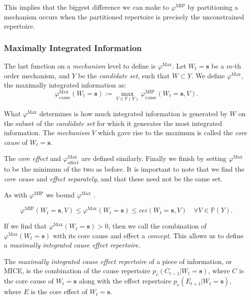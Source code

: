 This implies that the biggest difference we can make to $\varphi^{\text{MIP}}$ by partitioning a mechanism occurs when the partitioned repertoire is precisely the unconstrained repertoire. 



\subsubsection{Maximally Integrated Information}
The last function on a \textit{mechanism} level to define is $\varphi^{\text{Max}}$. Let $W_t = \mathbf{s}$ be a $m$-th order mechanism, and $Y$ be the \textit{candidate set}, such that $W \subset Y$. We define $\varphi^{\text{Max}}$, the maximally integrated information \cite{oizumi2014phenomenology} as: 
\begin{equation}
\label{def:core_cause}
\varphi^{\text{Max}}_{\text{cause}}(W_t = \mathbf{s}):=\max \limits_{V \in \mathbb{P}(Y)}\varphi^{\text{MIP}}_{\text{cause}}(W_t = \mathbf{s}, V).
\end{equation}

What $\varphi^{\text{Max}}$ determines is how much integrated information is generated by $W$ on the subset of the \textit{candidate set} for which it generates the most integrated information. The \textit{mechanism} $V$ which gave rise to the maximum is called the \textit{core cause} of $W_t = \mathbf{s}$.

The \textit{core effect} and  $\varphi^{\text{Max}}_{\text{effect}}$ are defined similarly. Finally we finish  by setting $\varphi^{\text{Max}}$ to be the minimum of the two as before. It is important to note that we find the \textit{core cause} and \textit{effect separately}, and that these need not be the same set.

As with $\varphi^{\text{MIP}}$ we bound $\varphi^{\text{Max}}$ \cite{marshall2016integrated}. 

\begin{equation}
\label{eq:bound_phimax}
\varphi^{\text{MIP}}(W_t = \mathbf{s}, V) \leq \varphi^{\text{Max}}(W_t = \mathbf{s})\leq cei(W_t = \mathbf{s}, V) \quad \forall V \in \mathbb{P}(Y).
\end{equation}

If we find that $\varphi^{\text{Max}}(W_t =\mathbf{s})>0$, then we call the combination of $\varphi^{\text{Max}}(W_t = \mathbf{s})$ with its core cause and effect a \textit{concept}. This allows us to define a \textit{maximally integrated cause effect repertoire}.

\begin{definition}
	{The \textit{maximally integrated cause effect repertoire} of a piece of information, or MICE, is the combination of the cause repertoire $p_c(C_{t-1}|W_t = \mathbf{s})$, where $C$ is the core cause of $W_t=\mathbf{s}$ along with the effect repertoire $p_e(E_{t+1}|W_t = \mathbf{s})$, where $E$ is the core effect of $W_t = \mathbf{s}$.}
\end{definition}

